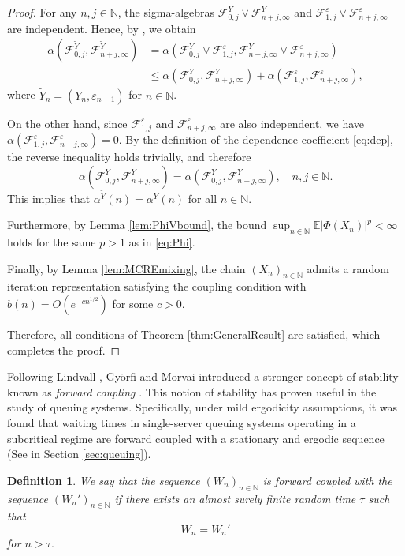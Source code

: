 \documentclass[a4paper,10pt]{article}
\newtheorem{definition}[theorem]{Definition}
\newcommand{\N}{\mathbb{N}}
\newcommand{\F}{\mathcal{F}}
\newcommand{\E}{\mathbb{E}}
\newcommand{\eps}{\varepsilon}
\begin{document}
\begin{proof}
	For any $n, j \in \N$, the sigma-algebras $\F_{0,j}^Y \vee \F_{n+j,\infty}^Y$ and $\F_{1,j}^\eps \vee \F_{n+j,\infty}^\eps$ are independent. Hence, by \cite[Lemma 8 on page 13]{BRADLEY19811}, we obtain
	\begin{align*}
		\alpha\left(
		\F_{0,j}^{\tilde{Y}}, \F_{n+j,\infty}^{\tilde{Y}}
		\right)
		&=
		\alpha\left( \F_{0,j}^Y \vee \F_{1,j}^\eps, \F_{n+j,\infty}^Y \vee \F_{n+j,\infty}^\eps \right) \\
		&\le 
		\alpha\left( \F_{0,j}^Y, \F_{n+j,\infty}^Y \right) + \alpha\left( \F_{1,j}^\eps, \F_{n+j,\infty}^\eps \right),
	\end{align*}
	where $\tilde{Y}_n = (Y_n, \eps_{n+1})$ for $n \in \N$.
	
	On the other hand, since $\F_{1,j}^\eps$ and $\F_{n+j,\infty}^\eps$ are also independent, we have $\alpha\left( \F_{1,j}^\eps, \F_{n+j,\infty}^\eps \right) = 0$. By the definition of the dependence coefficient \eqref{eq:dep}, the reverse inequality holds trivially, and therefore
	$$
	\alpha\left( \F_{0,j}^{\tilde{Y}}, \F_{n+j,\infty}^{\tilde{Y}} \right) = \alpha\left( \F_{0,j}^Y, \F_{n+j,\infty}^Y \right), \quad n, j \in \N.
	$$
	This implies that $\alpha^{\tilde{Y}}(n) = \alpha^Y(n)$ for all $n \in \N$.
	
	\medskip
	Furthermore, by Lemma \ref{lem:PhiVbound}, the bound $\sup_{n \in \N} \E |\Phi(X_n)|^p < \infty$ holds for the same $p > 1$ as in \eqref{eq:Phi}.
	
	\medskip
	Finally, by Lemma \ref{lem:MCREmixing}, the chain $(X_n)_{n \in \N}$ admits a random iteration representation satisfying the coupling condition with $b(n) = O(e^{-c n^{1/2}})$ for some $c > 0$.
	
	\medskip
	Therefore, all conditions of Theorem \ref{thm:GeneralResult} are satisfied, which completes the proof.
	
\end{proof}

Following Lindvall \cite{lindvall2002lectures}, Györfi and Morvai introduced a stronger concept of stability known as \emph{forward coupling} \cite{gyorfi2002}. This notion of stability has proven useful in the study of queuing systems. Specifically, under mild ergodicity assumptions, it was found that waiting times in single-server queuing systems operating in a subcritical regime are forward coupled with a stationary and ergodic sequence (See in Section \ref{sec:queuing}).

\begin{definition}\label{def_fwd_cpl}
	We say that the sequence $(W_n)_{n\in\N}$ is \emph{forward coupled} with the sequence $(W_n')_{n\in\N}$ if there exists an almost surely finite random time $\tau$
	such that
	$$
	W_n=W_n'
	$$
	for $n>\tau$.
\end{definition}
\end{document}
